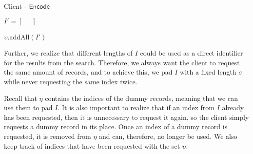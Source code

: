 \begin{algorithm}[H]
    \LinesNumbered
    \caption{Client - $ \mathsf{{Encode}} $}
    \label{algo:Encode}

    \vspace*{0.48cm}

    $ I' = \left[ \phantom{=} \right] $



    $ \upsilon $.addAll$ \left( I' \right) $

    \vspace*{0.48cm}

\end{algorithm}

\clearpage

Further, we realize that different lengths of $ I $ could be used as a direct identifier for the results from the search. Therefore, we always want the client to request the same amount of records, and to achieve this, we pad $ I $ with a fixed length $ \sigma $ while never requesting the same index twice. 

Recall that $ \eta $ contains the indices of the dummy records, meaning that we can use them to pad $ I $. It is also important to realize that if an index from $ I $ already has been requested, then it is unnecessary to request it again, so the client simply requests a dummy record in its place. Once an index of a dummy record is requested, it is removed from $ \eta $ and can, therefore, no longer be used. We also keep track of indices that have been requested with the set $ \upsilon $.
\raggedbottom

